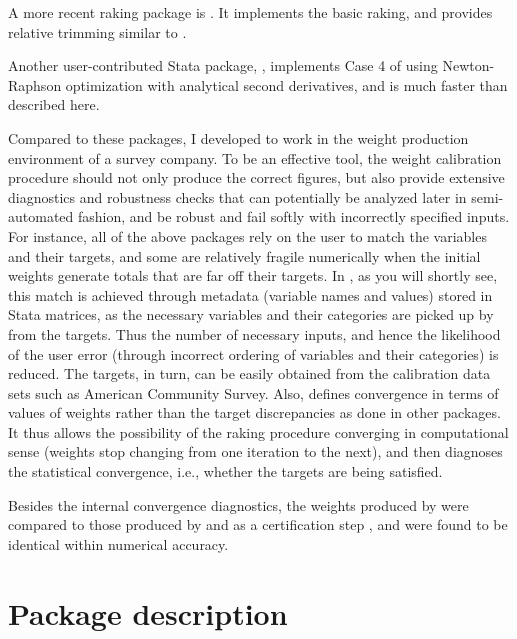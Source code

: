 A more recent raking package is  \citep{bergmann:2011}.
It implements the basic raking, and provides relative trimming similar
to .

Another user-contributed Stata package, 
\citep{wittenberg:2010}, implements Case 4 of \citet{deville:sarndal:1992} using
Newton-Raphson optimization with analytical second derivatives,
and is much faster than  described here.

Compared to these packages, I developed  to work in
the weight production environment of a survey company. To be an effective tool,
the weight calibration procedure should not only produce the correct figures,
but also provide extensive diagnostics and robustness checks that can potentially
be analyzed later in semi-automated fashion, and be robust and fail softly with
incorrectly specified inputs. For instance, all of the above packages rely on the user
to match the variables and their targets, and some are relatively fragile numerically
when the initial weights generate totals that are far off their targets. 
In , as you will shortly see, this match is achieved through metadata 
(variable names and values) stored in Stata matrices, as the necessary
variables and their categories are picked up by  from the targets. 
Thus the number of necessary inputs, and hence the likelihood of the user error 
(through incorrect ordering of variables and their categories) is reduced.
The targets, in turn, can be easily obtained from the calibration data sets
such as American Community Survey. Also,  defines convergence in
terms of values of weights rather than the target discrepancies as done in other
packages. It thus allows the possibility of the raking procedure converging
in computational sense (weights stop changing from one iteration to the next), 
and then diagnoses the statistical convergence, i.e., whether the targets 
are being satisfied.

Besides the internal convergence diagnostics, the weights produced by 
were compared to those produced by  and 
as a certification step \citep{gould:2001}, and were found to be identical
within numerical accuracy.

\section{Package description}

